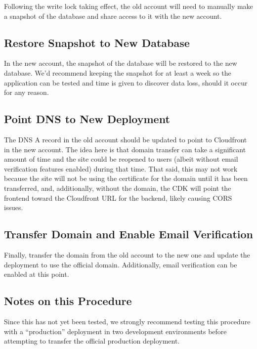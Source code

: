 \documentclass{article}
\begin{document}
Following the write lock taking effect, the old account
will need to manually make a snapshot of the database and
share access to it with the new account.

\subsection{Restore Snapshot to New Database}

In the new account, the snapshot of the database will be
restored to the new database. We'd recommend keeping the
snapshot for at least a week so the application can be
tested and time is given to discover data loss, should it
occur for any reason.

\subsection{Point DNS to New Deployment}

The DNS A record in the old account should be updated to
point to Cloudfront in the new account. The idea here is
that domain transfer can take a significant amount of time
and the site could be reopened to users (albeit without
email verification features enabled) during that time.
That said, this may not work because the site will not be
using the certificate for the domain until it has been
transferred, and, additionally, without the domain, the
CDK will point the frontend toward the Cloudfront URL for
the backend, likely causing CORS issues.

\subsection{Transfer Domain and Enable Email Verification}

Finally, transfer the domain from the old account to the
new one and update the deployment to use the official 
domain. Additionally, email verification can be enabled
at this point.

\subsection{Notes on this Procedure}

Since this has not yet been tested, we strongly recommend
testing this procedure with a ``production'' deployment in
two development environments before attempting to transfer
the official production deployment.
\end{document}
